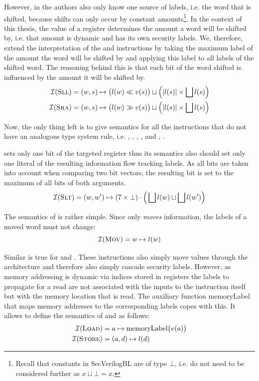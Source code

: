However, in \cite{Ferraiuolo17} the authors also only know one source of labels, i.e. the word that is shifted, because shifts can only occur by constant amounts\footnote{%
    Recall that constants in SecVerilogBL are of type $ \bot $, i.e. do not need to be considered further as $ x \sqcup \bot = x $.
}.
In the context of this thesis, the value of a register determines the amount a word will be shifted by, i.e. that amount is dynamic and has its own security labels.
We, therefore, extend the interpretation of the  and  instructions by taking the maximum label of the amount the word will be shifted by and applying this label to all labels of the shifted word.
The reasoning behind this is that each bit of the word shifted is influenced by the amount it will be shifted by.
\begin{align*}
    \mathcal{I}(\textsc{Sll}) &= (w, s) \mapsto \big(l(w) \ll v(s) \big) \sqcup \Big(|l(s)| \times \bigsqcup l(s) \Big) \\
    \mathcal{I}(\textsc{Sra}) &= (w, s) \mapsto \big(l(w) \gg v(s) \big) \sqcup \Big(|l(s)| \times \bigsqcup l(s) \Big)
\end{align*}

Now, the only thing left is to give semantics for all the instructions that do not have an analogous type system rule, i.e. , , , ,  and , .

 sets only one bit of the targeted register thus its semantics also should set only one literal of the resulting information flow tracking labels.
As all bits are taken into account when comparing two bit vectors, the resulting bit is set to the maximum of all bits of both arguments.
\begin{equation*}
    \mathcal{I}(\textsc{Slt}) = (w, w') \mapsto (7 \times \bot) \cdot \Big(\bigsqcup l(w) \sqcup \bigsqcup l(w') \Big)
\end{equation*}

The semantics of  is rather simple.
Since  only \textit{moves} information, the labels of a moved word must not change:
\begin{equation*}
    \mathcal{I}(\textsc{Mov}) = w \mapsto l(w)
\end{equation*}

Similar is true for  and .
These instructions also simply move values through the architecture and therefore also simply cascade security labels.
However, as memory addressing is dynamic via indices stored in registers the labels to propagate for a read are not associated with the inputs to the instruction itself but with the memory location that is read.
The auxiliary function \mbox{memoryLabel} that maps memory addresses to the corresponding labels copes with this.
It allows to define the semantics of  and  as follows:
\begin{align*}
    \mathcal{I}(\textsc{Load}) &= a \mapsto \text{memoryLabel}\big(v(a) \big) \\
    \mathcal{I}(\textsc{Store}) &= (a, d) \mapsto l(d)
\end{align*}

